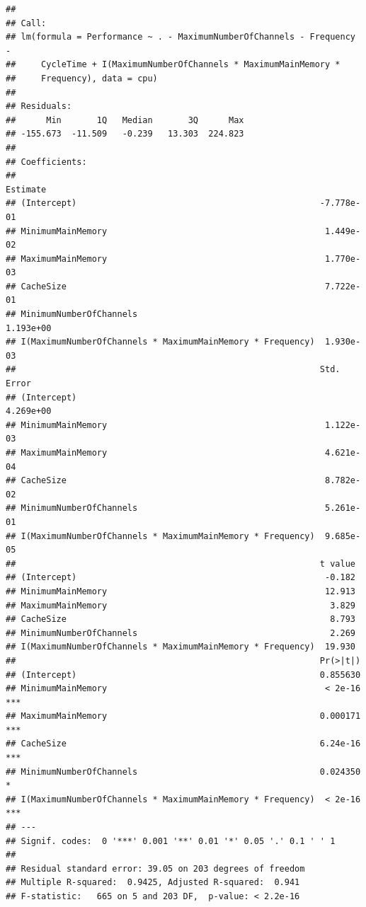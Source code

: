 \documentclass[
]{article}
\begin{document}
\begin{lstlisting}
## 
## Call:
## lm(formula = Performance ~ . - MaximumNumberOfChannels - Frequency - 
##     CycleTime + I(MaximumNumberOfChannels * MaximumMainMemory * 
##     Frequency), data = cpu)
## 
## Residuals:
##      Min       1Q   Median       3Q      Max 
## -155.673  -11.509   -0.239   13.303  224.823 
## 
## Coefficients:
##                                                              Estimate
## (Intercept)                                                -7.778e-01
## MinimumMainMemory                                           1.449e-02
## MaximumMainMemory                                           1.770e-03
## CacheSize                                                   7.722e-01
## MinimumNumberOfChannels                                     1.193e+00
## I(MaximumNumberOfChannels * MaximumMainMemory * Frequency)  1.930e-03
##                                                            Std. Error
## (Intercept)                                                 4.269e+00
## MinimumMainMemory                                           1.122e-03
## MaximumMainMemory                                           4.621e-04
## CacheSize                                                   8.782e-02
## MinimumNumberOfChannels                                     5.261e-01
## I(MaximumNumberOfChannels * MaximumMainMemory * Frequency)  9.685e-05
##                                                            t value
## (Intercept)                                                 -0.182
## MinimumMainMemory                                           12.913
## MaximumMainMemory                                            3.829
## CacheSize                                                    8.793
## MinimumNumberOfChannels                                      2.269
## I(MaximumNumberOfChannels * MaximumMainMemory * Frequency)  19.930
##                                                            Pr(>|t|)    
## (Intercept)                                                0.855630    
## MinimumMainMemory                                           < 2e-16 ***
## MaximumMainMemory                                          0.000171 ***
## CacheSize                                                  6.24e-16 ***
## MinimumNumberOfChannels                                    0.024350 *  
## I(MaximumNumberOfChannels * MaximumMainMemory * Frequency)  < 2e-16 ***
## ---
## Signif. codes:  0 '***' 0.001 '**' 0.01 '*' 0.05 '.' 0.1 ' ' 1
## 
## Residual standard error: 39.05 on 203 degrees of freedom
## Multiple R-squared:  0.9425, Adjusted R-squared:  0.941 
## F-statistic:   665 on 5 and 203 DF,  p-value: < 2.2e-16
\end{lstlisting}
\end{document}

